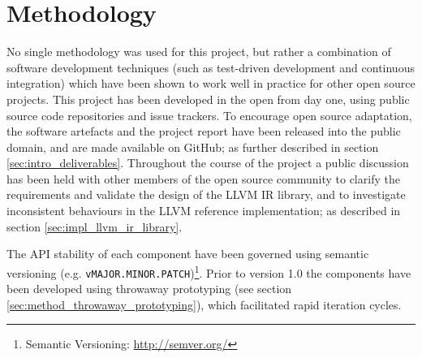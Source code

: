 

\section{Methodology}
\label{sec:methodology}

No single methodology was used for this project, but rather a combination of software development techniques (such as test-driven development and continuous integration) which have been shown to work well in practice for other open source projects. This project has been developed in the open from day one, using public source code repositories and issue trackers. To encourage open source adaptation, the software artefacts and the project report have been released into the public domain, and are made available on GitHub; as further described in section \ref{sec:intro_deliverables}. Throughout the course of the project a public discussion has been held with other members of the open source community to clarify the requirements and validate the design of the LLVM IR library, and to investigate inconsistent behaviours in the LLVM reference implementation; as described in section \ref{sec:impl_llvm_ir_library}.

The API stability of each component have been governed using semantic versioning (e.g. \texttt{vMAJOR.MINOR.PATCH})\footnote{Semantic Versioning: \url{http://semver.org/}}. Prior to version 1.0 the components have been developed using throwaway prototyping (see section \ref{sec:method_throwaway_prototyping}), which facilitated rapid iteration cycles. %




